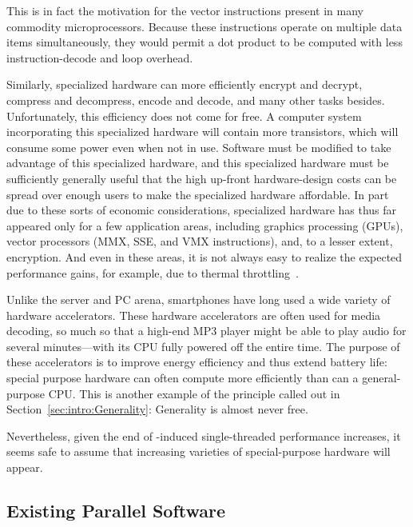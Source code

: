 This is in fact the motivation for the vector instructions present in
many commodity microprocessors.
Because these instructions operate on multiple data items simultaneously,
they would permit a dot product to be computed with less instruction-decode
and loop overhead.

Similarly, specialized hardware can more efficiently encrypt and decrypt,
compress and decompress, encode and decode, and many other tasks besides.
Unfortunately, this efficiency does not come for free.
A computer system incorporating this specialized hardware will contain
more transistors, which will consume some power even when not in use.
Software must be modified to take advantage of this specialized hardware,
and this specialized hardware must be sufficiently generally useful
that the high up-front hardware-design costs can be spread over enough
users to make the specialized hardware affordable.
In part due to these sorts of economic considerations, specialized
hardware has thus far appeared only for a few application areas,
including graphics processing (GPUs), vector processors (MMX, SSE,
and VMX instructions), and, to a lesser extent, encryption.
And even in these areas, it is not always easy to realize the expected
performance gains, for example, due to thermal
throttling~\cite{VladKrasnov2017SIMDfreqscale,DanielLemire2018SIMDfreqscale,TravisDowns2020SIMDfreqscale}.

Unlike the server and PC arena, smartphones have long used a wide
variety of hardware accelerators.
These hardware accelerators are often used for media decoding,
so much so that a high-end MP3 player might be able to play audio
for several minutes---with its CPU fully powered off the entire time.
The purpose of these accelerators is to improve energy efficiency
and thus extend battery life: special purpose hardware can often
compute more efficiently than can a general-purpose CPU\@.
This is another example of the principle called out in
Section~\ref{sec:intro:Generality}: Generality is almost never free.

Nevertheless, given the end of -induced
single-threaded performance increases, it seems safe to assume that
increasing varieties of special-purpose hardware will appear.

\subsection{Existing Parallel Software}
\label{sec:cpu:Existing Parallel Software}

